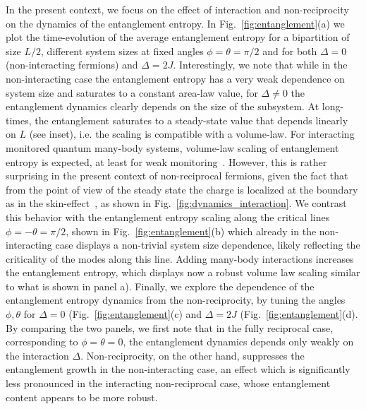 \documentclass[floatfix,reprint,amsmath,amssymb,superscriptaddress,aps,prl]{revtex4-2}
\begin{document}
In the present context, we focus on the effect of interaction and non-reciprocity on the dynamics of the entanglement entropy. In Fig.~\ref{fig:entanglement}(a) we plot the time-evolution of the average entanglement entropy for a bipartition of size $L/2$, different system sizes at fixed angles $\phi=\theta=\pi/2$ and for both $\Delta=0$ (non-interacting fermions) and $\Delta=2J$.  Interestingly, we note that while in the non-interacting case the entanglement entropy has a very weak dependence on system size and saturates to a constant area-law value, for $\Delta\neq0$ the entanglement dynamics clearly depends on the size of the subsystem. At long-times, the entanglement saturates to a steady-state value that depends linearly on $L$ (see inset), i.e. the scaling is compatible with a volume-law. For interacting monitored quantum many-body systems, volume-law scaling of entanglement entropy is expected, at least for weak monitoring~\cite{xing2023interactions,poboiko2025measurement}. However, this is rather surprising in the present context of non-reciprocal fermions, given the fact that from the point of view of the steady state the charge is localized at the boundary as in the skin-effect~\cite{kawabata2023entanglement}, as shown in Fig.~\ref{fig:dynamics_interaction}. We contrast this behavior with the entanglement entropy scaling along the critical lines $\phi=-\theta=\pi/2$, shown in Fig.~\ref{fig:entanglement}(b) which already in the non-interacting case displays a non-trivial system size dependence, likely reflecting the criticality of the modes along this line. Adding many-body interactions increases the entanglement entropy, which displays now a robust volume law scaling similar to what is shown in panel a). Finally, we explore the dependence of the entanglement entropy dynamics from the non-reciprocity, by tuning the angles $\phi,\theta$ for $\Delta=0$ (Fig.~\ref{fig:entanglement}(c)  and $\Delta=2J$ (Fig.~\ref{fig:entanglement}(d). By comparing the two panels, we first note that in the fully reciprocal case, corresponding to $\phi=\theta=0$, the entanglement dynamics depends only weakly on the interaction $\Delta$. Non-reciprocity, on the other hand, suppresses the entanglement growth in the non-interacting case, an effect which is significantly less pronounced in the interacting non-reciprocal case, whose entanglement content appears to be more robust.

\nocite{Haga2021Liouvillian,kamenev2023field,thompson2023field,Landi2024_prx_quantum}
\end{document}
